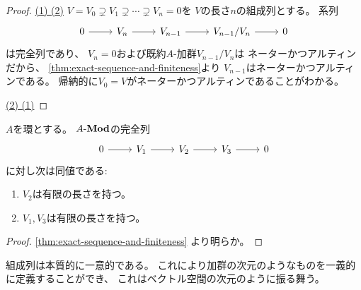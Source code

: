 \documentclass[report]{jlreq}
\begin{document}
\begin{proof}
    \uline{(1) \Rightarrow (2)} \quad
    $V = V_0 \supsetneq V_1 \supsetneq \cdots \supsetneq V_n = 0$を
    $V$の長さ$n$の組成列とする。
    系列
    \begin{equation}
        \begin{tikzcd}
            0
                \ar{r}
                & V_n
                    \ar{r}
                & V_{n - 1}
                    \ar{r}
                & V_{n - 1} / V_n
                    \ar{r}
                & 0
        \end{tikzcd}
    \end{equation}
    は完全列であり、
    $V_n = 0$および既約$A$-加群$V_{n - 1} / V_n$は
    ネーターかつアルティンだから、
    \cref{thm:exact-sequence-and-finiteness}より
    $V_{n - 1}$はネーターかつアルティンである。
    帰納的に$V_0 = V$がネーターかつアルティンであることがわかる。

    \uline{(2) \Rightarrow (1)} \quad

    \TODO{}
\end{proof}

\begin{corollary}
    $A$を環とする。
    $A\text{-}\mathbf{Mod}$の完全列
    \begin{equation}
        \begin{tikzcd}
            0
                \ar{r}
                & V_1
                    \ar{r}
                & V_2
                    \ar{r}
                & V_3
                    \ar{r}
                & 0
        \end{tikzcd}
    \end{equation}
    に対し次は同値である:
    \begin{enumerate}
        \item $V_2$は有限の長さを持つ。
        \item $V_1, V_3$は有限の長さを持つ。
    \end{enumerate}
\end{corollary}

\begin{proof}
    \cref{thm:exact-sequence-and-finiteness}
    より明らか。
\end{proof}

組成列は本質的に一意的である。
これにより加群の次元のようなものを一義的に定義することができ、
これはベクトル空間の次元のように振る舞う。


\end{document}
